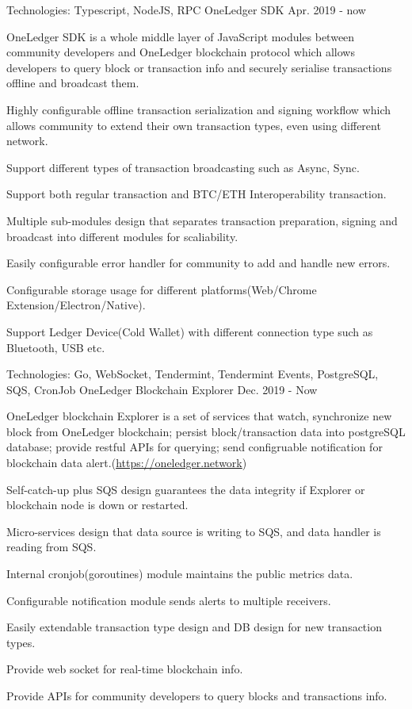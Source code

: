 \begin{cventries}
\cventry
    {Technologies: \quad Typescript, NodeJS, RPC}
    {OneLedger SDK}
    {}
    {Apr. 2019 - now}
    {
      \begin{cvitems}
        \item {OneLedger SDK is a whole middle layer of JavaScript modules between community developers and OneLedger blockchain protocol which allows developers to query block or transaction info and securely serialise transactions offline and broadcast them.}
        \item {Highly configurable offline transaction serialization and signing workflow which allows community to extend their own transaction types, even using different network.}
        \item {Support different types of transaction broadcasting such as Async, Sync.}
        \item {Support both regular transaction and BTC/ETH Interoperability transaction.}
        \item {Multiple sub-modules design that separates transaction preparation, signing and broadcast into different modules for scaliability.}
        \item {Easily configurable error handler for community to add and handle new errors.}
        \item {Configurable storage usage for different platforms(Web/Chrome Extension/Electron/Native).}
        \item {Support Ledger Device(Cold Wallet) with different connection type such as Bluetooth, USB etc.}
      \end{cvitems}
    }
    
    \cventry
    {Technologies: \quad Go, WebSocket, Tendermint, Tendermint Events, PostgreSQL, SQS, CronJob}
    {OneLedger Blockchain Explorer}
    {}
    {Dec. 2019 - Now}
    {
      \begin{cvitems}
        \item {OneLedger blockchain Explorer is a set of services that watch, synchronize new block from OneLedger blockchain; persist block/transaction data into postgreSQL database; provide restful APIs for querying; send configruable notification for blockchain data alert.(\url{https://oneledger.network})}
        \item {Self-catch-up plus SQS design guarantees the data integrity if Explorer or blockchain node is down or restarted.}
        \item {Micro-services design that data source is writing to SQS, and data handler is reading from SQS.}
        \item {Internal cronjob(goroutines) module maintains the public metrics data.}
        \item {Configurable notification module sends alerts to multiple receivers.}
        \item {Easily extendable transaction type design and DB design for new transaction types.}
        \item {Provide web socket for real-time blockchain info.}
        \item {Provide APIs for community developers to query blocks and transactions info.}
      \end{cvitems}
    }


\end{cventries}
